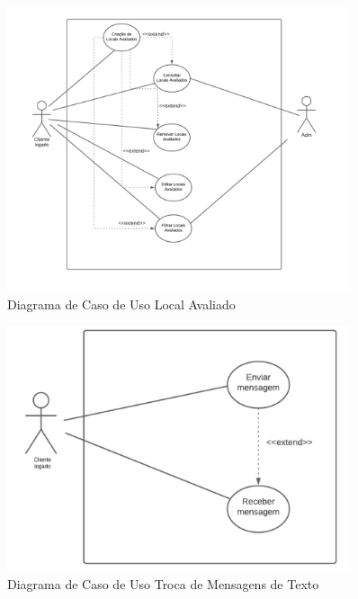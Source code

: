 \begin{figure}[htb]

    \centering
	\caption{\label{fig_arq_virado}Diagrama de Caso de Uso Local Avaliado}
	\includegraphics[width=0.9\textwidth]{anexos/diagramaAvaliado.png}

	\end{figure}
\begin{figure}[htb]

    \centering
	\caption{\label{fig_arq_virado}Diagrama de Caso de Uso Troca de Mensagens de Texto}
	\includegraphics[width=0.9\textwidth]{anexos/diagramaMensagem.png}

	\end{figure}
